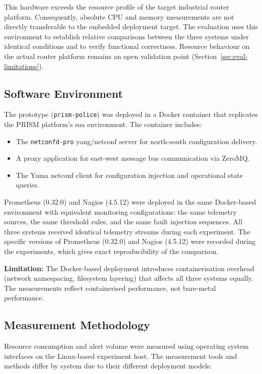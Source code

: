 This hardware exceeds the resource profile of the target industrial router platform. Consequently, absolute CPU and memory measurements are not directly transferable to the embedded deployment target. The evaluation uses this environment to establish relative comparisons between the three systems under identical conditions and to verify functional correctness. Resource behaviour on the actual router platform remains an open validation point (Section~\ref{sec:eval-limitations}).

\subsection{Software Environment}

The prototype (\texttt{prism-police}) was deployed in a Docker container that replicates the PRISM platform's \gls{soa} environment. The container includes:

\begin{itemize}
\item The \texttt{netconfd-pro} \gls{yang}/\gls{netconf} server for north-south configuration delivery.
\item A proxy application for east-west message bus communication via ZeroMQ.
\item The Yuma \gls{netconf} client for configuration injection and operational state queries.
\end{itemize}

Prometheus (0.32.0) and Nagios (4.5.12) were deployed in the same Docker-based environment with equivalent monitoring configurations: the same telemetry sources, the same threshold rules, and the same fault injection sequences. All three systems received identical telemetry streams during each experiment. The specific versions of Prometheus (0.32.0) and Nagios (4.5.12) were recorded during the experiments, which gives exact reproducibility of the comparison.

\textbf{Limitation:} The Docker-based deployment introduces containerisation overhead (network namespacing, filesystem layering) that affects all three systems equally. The measurements reflect containerised performance, not bare-metal performance.
\subsection{Measurement Methodology}

Resource consumption and alert volume were measured using operating system interfaces on the Linux-based experiment host. The measurement tools and methods differ by system due to their different deployment models:

